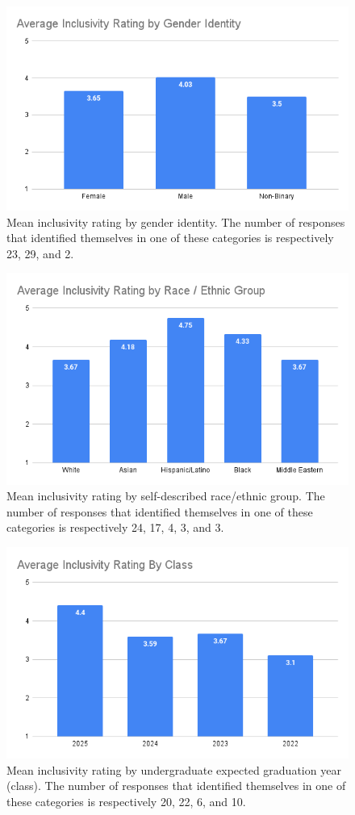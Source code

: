 \documentclass{article}
\begin{document}
\begin{figure}[!h]
\includegraphics[width=.75\textwidth]{gender_identity.png}
\caption{Mean inclusivity rating by gender identity.
The number of responses that identified themselves in 
one of these categories is respectively 23, 29, and 2.}
\label{gender}
\end{figure}
\begin{figure}[!h]
\includegraphics[width=.75\textwidth]{race_ethnic_group.png}
\caption{Mean inclusivity rating by self-described race/ethnic group.
The number of responses that identified themselves in 
one of these categories is respectively 24, 17, 4, 3, and 3.}
\label{race}
\end{figure}
\begin{figure}[!h]
\includegraphics[width=.75\textwidth]{class.png}
\caption{Mean inclusivity rating by undergraduate expected graduation year (class).
The number of responses that identified themselves in 
one of these categories is respectively 20, 22, 6, and 10.}
\label{class}
\end{figure}
\end{document}
